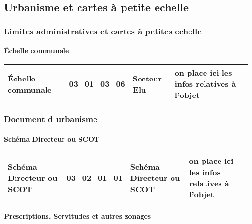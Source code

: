 \documentclass[12pt,titlepage,oneside]{book}
\begin{document}
\subsection{Urbanisme et cartes à petite echelle}
\subsubsection{\large Limites administratives et cartes à petites echelle}
\paragraph{Échelle communale}
\noindent
\vspace{\baselineskip}

\renewcommand{\arraystretch}{1.2}
\begin{supertabular}{|p{10cm}|c|p{13cm}|p{12cm}|}
 Échelle communale & 03\_01\_03\_06 & Secteur Elu & on place ici les infos relatives à l'objet\\
\hline
\end{supertabular}
\begin{figure}[h!]
  \hfill         %
\end{figure}

\subsubsection{\large Document d urbanisme}
\paragraph{Schéma Directeur ou SCOT}
\noindent
\vspace{\baselineskip}

\renewcommand{\arraystretch}{1.2}
\begin{supertabular}{|p{10cm}|c|p{13cm}|p{12cm}|}
 Schéma Directeur ou SCOT & 03\_02\_01\_01 & Schéma Directeur ou SCOT & on place ici les infos relatives à l'objet\\
\hline
\end{supertabular}
\begin{figure}[h!]
  \hfill         %
\end{figure}


\paragraph{Prescriptions, Servitudes et autres zonages}
\noindent
\vspace{\baselineskip}
\end{document}
